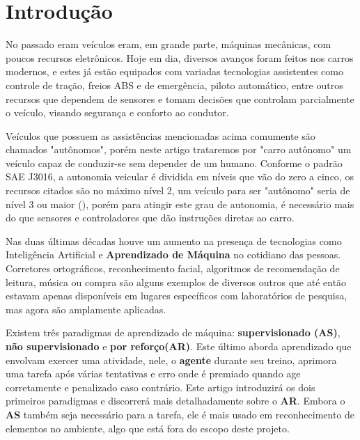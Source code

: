 
\chapter*[Introdução]{Introdução}

No passado eram veículos eram, em grande parte, máquinas mecânicas, com poucos recursos eletrônicos. Hoje em dia, diversos avanços foram feitos nos carros modernos, e estes já estão equipados com variadas tecnologias assistentes como controle de tração, freios ABS e de emergência, piloto automático, entre outros recursos que dependem de sensores e tomam decisões que controlam parcialmente o veículo, visando segurança e conforto ao condutor. 

Veículos que possuem as assistências mencionadas acima comumente são chamados "autônomos", porém neste artigo trataremos por "carro autônomo" um veículo capaz de conduzir-se sem depender de um humano. Conforme o padrão SAE J3016, a autonomia veicular é dividida em níveis que vão do zero a cinco, os recursos citados são no máximo nível 2, um veículo para ser "autônomo"{} seria de nível 3 ou maior (), porém para atingir este grau de autonomia, é necessário mais do que sensores e controladores que dão instruções diretas ao carro.

Nas duas últimas décadas houve um aumento na presença de tecnologias como Inteligência Artificial e \textbf{Aprendizado de Máquina} no cotidiano das pessoas. Corretores ortográficos, reconhecimento facial, algoritmos de recomendação de leitura, música ou compra são alguns exemplos de diversos outros que até então estavam apenas disponíveis em lugares específicos com laboratórios de pesquisa, mas agora são amplamente aplicadas. 

Existem três paradigmas de aprendizado de máquina: \textbf{supervisionado (AS)}, \textbf{não supervisionado} e \textbf{por reforço(AR)}. Este último aborda aprendizado que envolvam exercer uma atividade, nele, o \textbf{agente} durante seu treino, aprimora uma tarefa após várias tentativas e erro onde é premiado quando age corretamente e penalizado caso contrário. Este artigo introduzirá os dois primeiros paradigmas e discorrerá mais detalhadamente sobre o \textbf{AR}. Embora o \textbf{AS} também seja necessário para a tarefa, ele é mais usado em reconhecimento de elementos no ambiente, algo que está fora do escopo deste projeto.

